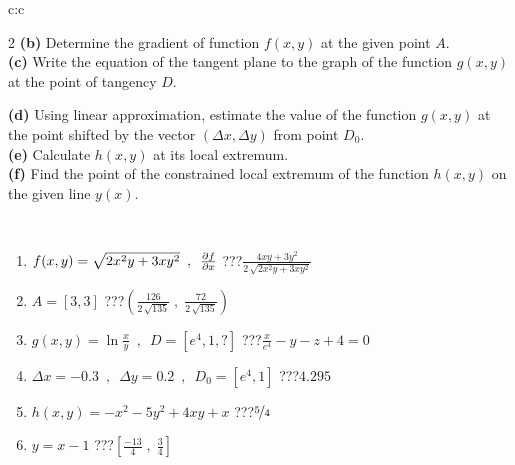 \documentclass[10pt]{report}
\begin{document}
\begin{tabular}{c:c}
\begin{minipage}[c][104.5mm][t]{0.5\linewidth}
\begin{center}
\begin{minipage}{0.95\linewidth}
\begin{center}
{\begin{multicols}{2}
\textbf{(b)} Determine the gradient of function \(f(x,y)\) at the given point \(A\). \\[1mm]
\textbf{(c)} Write the equation of the tangent plane to the graph of the function \(g(x,y)\) at the point of tangency \(D\). \par \columnbreak
\textbf{(d)} Using linear approximation, estimate the value of the function \(g(x,y)\) at the point shifted by the vector \((\Delta x, \Delta y)\) from point \(D_0\). \\[1mm]
\textbf{(e)} Calculate \(h(x,y)\) at its local extremum. \\[1mm]
\textbf{(f)} Find the point of the constrained local extremum of the function \(h(x,y)\) on the given line \(y(x)\). \\[1mm]
\end{multicols}
}
\end{center}
\end{minipage}
\\[4mm]
\begin{minipage}{0.79\linewidth}
\begin{center}
\begin{varwidth}{\linewidth}
\begin{enumerate}
\normalsizerr
\item $f(x,y) = \sqrt{2x^2y + 3xy^2}\enspace , \enspace \pdv{f}{x}$\quad \dotfill\; ???\;\dotfill \quad $\frac{4xy+3y^2}{2\,\sqrt{2x^2y+3xy^2}}$
\item $A = [3, 3]$\quad \dotfill\; ???\;\dotfill \quad $\left( \frac{126}{2\,\sqrt{135}} \;,\; \frac{72}{2\,\sqrt{135}} \right)$
\item $g(x,y) = \ln\frac{x}{y} \enspace , \enspace D=[e^{4},1,?]$\quad \dotfill\; ???\;\dotfill \quad $\frac{x}{e^4} - y - z + 4 = 0$
\item $\Delta x = {-0.3} \enspace,\enspace \Delta y = {0.2} \enspace,\enspace D_0 = [e^{4},1]$\quad \dotfill\; ???\;\dotfill \quad $4.295$
\item $h(x,y) = -x^2-5y^2+4xy+x$\quad \dotfill\; ???\;\dotfill \quad $\nicefrac{5}{4}$
\item $y = x-1$\quad \dotfill\; ???\;\dotfill \quad $\left[\frac{-13}{4}\;,\;\frac{3}{4}\right]$
\end{enumerate}
\end{varwidth}
\end{center}
\end{minipage}
\begin{minipage}{0.20\linewidth}
\begin{center}

\end{center}
\end{minipage}
\end{center}
\end{minipage}
\end{tabular}
\end{document}
